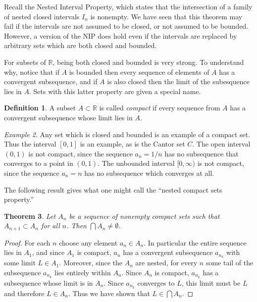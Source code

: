 \documentclass[11pt,oneside]{amsbook}
\newcommand{\RR}{\mathbb R}
\theoremstyle{definition}
\theoremstyle{plain}
\newtheorem{thm}{Theorem}[section]
\theoremstyle{definition}
\newtheorem{defn}[thm]{Definition}
\theoremstyle{remark}
\newtheorem{example}[thm]{Example}
\numberwithin{equation}{section}
\numberwithin{figure}{section}
\begin{document}
Recall the Nested Interval Property, which states that the intersection of a family of nested closed intervals $I_n$ is nonempty. We have seen that this theorem may fail if the intervals are not assumed to be closed, or not assumed to be bounded. However, a version of the NIP does hold even if the intervals are replaced by arbitrary sets which are both closed and bounded.

For subsets of $\RR$, being both closed and bounded is very strong. To understand why, notice that if $A$ is bounded then every sequence of elements of $A$ has a convergent subsequence, and if $A$ is also closed then the limit of the subesquence lies in $A$. Sets with this latter property are given a special name.

\begin{defn}
  A subset $A\subset\RR$ is called \emph{compact} if every sequence from $A$ has a convergent subsequence whose limit lies in $A$.
\end{defn}

\begin{example}
  Any set which is closed and bounded is an example of a compact set. Thus the interval $[0,1]$ is an example, as is the Cantor set $C$. The open interval $(0,1)$ is not compact, since the sequence $a_n=1/n$ has no subsequence that converges to a point in $(0,1)$. The unbounded interval $[0,\infty)$ is not compact, since the sequence $a_n=n$ has no subsequence which converges at all.
\end{example}

The following result gives what one might call the ``nested compact sets property.''

\begin{thm}
  Let $A_n$ be a sequence of nonempty compact sets such that $A_{n+1}\subset A_n$ for all $n$. Then $\bigcap A_n\neq\emptyset$.
\end{thm}

\begin{proof}
  For each $n$ choose any element $a_n\in A_n$. In particular the entire sequence lies in $A_1$, and since $A_1$ is compact, $a_n$ has a convergent subsequence $a_{n_k}$ with some limit $L\in A_1$. Moreover, since the $A_n$ are nested, for every $n$ some tail of the subsequence $a_{n_k}$ lies entirely within $A_n$. Since $A_n$ is compact, $a_{n_k}$ has a subsequence whose limit is in $A_n$. Since $a_{n_k}$ converges to $L$, this limit must be $L$ and therefore $L\in A_n$. Thus we have shown that $L\in\bigcap A_n$.
\end{proof}
\end{document}

